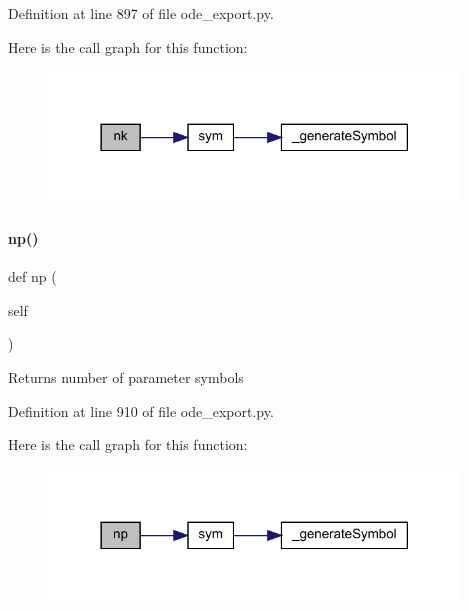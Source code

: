 Definition at line 897 of file ode\+\_\+export.\+py.

Here is the call graph for this function\+:
\nopagebreak
\begin{figure}[H]
\begin{center}
\leavevmode
\includegraphics[width=310pt]{classamici_1_1ode__export_1_1_o_d_e_model_a07767f24c77537a68972e99a79ef93aa_cgraph}
\end{center}
\end{figure}
\mbox{\label{classamici_1_1ode__export_1_1_o_d_e_model_a7278a09e012ba867faf10d809e13fb81}} 
\paragraph{\texorpdfstring{np()}{np()}}
{\footnotesize\ttfamily def np (\begin{DoxyParamCaption}\item[{}]{self }\end{DoxyParamCaption})}

\begin{DoxyReturn}{Returns}
number of parameter symbols 
\end{DoxyReturn}


Definition at line 910 of file ode\+\_\+export.\+py.

Here is the call graph for this function\+:
\nopagebreak
\begin{figure}[H]
\begin{center}
\leavevmode
\includegraphics[width=310pt]{classamici_1_1ode__export_1_1_o_d_e_model_a7278a09e012ba867faf10d809e13fb81_cgraph}
\end{center}
\end{figure}
\mbox{\label{classamici_1_1ode__export_1_1_o_d_e_model_a47906a8f4c249a513f4d6ca7c12d2304}} 
